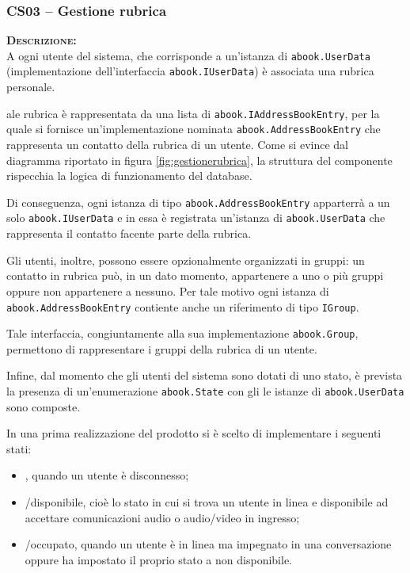 \subsubsection{CS03 -- Gestione rubrica}\label{sec:cs03}
\begin{description}
	\item{\scshape\bfseries Descrizione:}\\
A ogni utente del sistema, che corrisponde a un'istanza di \texttt{abook.UserData} (implementazione dell'interfaccia \texttt{abook.IUserData}) è associata una rubrica personale. 

ale rubrica è rappresentata da una lista di \texttt{abook.IAddressBookEntry}, per la quale si fornisce un'implementazione nominata \texttt{abook.AddressBookEntry} che rappresenta un contatto della rubrica di un utente. Come si evince dal diagramma riportato in figura \ref{fig:gestionerubrica}, la struttura del componente rispecchia la logica di funzionamento del database.

Di conseguenza, ogni istanza di tipo \texttt{abook.AddressBookEntry} apparterrà a un solo \texttt{abook.IUserData} e in essa è registrata un'istanza di \texttt{abook.UserData} che rappresenta il contatto facente parte della rubrica.

Gli utenti, inoltre, possono essere opzionalmente organizzati in gruppi: un contatto in rubrica può, in un dato momento, appartenere a uno o più gruppi oppure non appartenere a nessuno. Per tale motivo ogni istanza di \texttt{abook.AddressBookEntry} contiente anche un riferimento di tipo \texttt{IGroup}.

Tale interfaccia, congiuntamente alla sua implementazione \texttt{abook.Group}, permettono di rappresentare i gruppi della rubrica di un utente.

Infine, dal momento che gli utenti del sistema sono dotati di uno stato, è prevista la presenza di un'enumerazione \texttt{abook.State} con gli le istanze di \texttt{abook.UserData} sono composte.

In una prima realizzazione del prodotto si è scelto di implementare i seguenti stati:
\begin{itemize}
  \item {}, quando un utente è disconnesso;
  \item {}/disponibile, cioè lo stato in cui si trova un utente in linea e disponibile ad accettare comunicazioni audio o audio/video in ingresso;
  \item {}/occupato, quando un utente è in linea ma impegnato in una conversazione oppure ha impostato il proprio stato a non disponibile.
\end{itemize}


\end{description}
